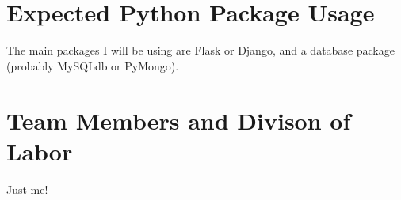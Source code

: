 \documentclass[11pt]{article}
\begin{document}
\section*{Expected Python Package Usage}

The main packages I will be using are Flask or Django, and a database package (probably MySQLdb or PyMongo).

\section*{Team Members and Divison of Labor}

Just me!
\end{document}
